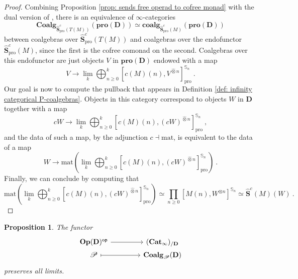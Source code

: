 \documentclass{proc-l}
\theoremstyle{plain}
\newtheorem{proposition}[{theorem}]{Proposition}
\theoremstyle{definition}
\theoremstyle{remark}
\begin{document}
\begin{proof}
Combining Proposition \ref{prop: sends free operad to cofree monad} with the dual version of \cite[Remark B.4]{pdalgebras}, there is an equivalence of $\infty$-categories
\[
\mathbf{Coalg}_{\widehat{\mathbf{S}}^c_{\mathrm{pro}}(T(M))}(\mathbf{pro}(\mathbf{D})) \simeq \mathbf{coalg}_{\widehat{\mathbf{S}}^c_{\mathrm{pro}}(M)}(\mathbf{pro}(\mathbf{D}))
\]
between coalgebras over $\widehat{\mathbf{S}}^c_{\mathrm{pro}}(T(M))$ and coalgebras over the endofunctor $\widehat{\mathbf{S}}^c_{\mathrm{pro}}(M)$, since the first is the cofree comonad on the second. Coalgebras over this endofunctor are just objects $V$ in $\mathbf{pro}(\mathbf{D})$ endowed with a map
\[
V \longrightarrow \lim_k \bigoplus_{n \geq 0}^{k} \left[c(M)(n),V^{\widehat{\otimes} n} \right]^{\mathbb{S}_n}_{\mathrm{pro}}~.
\]
Our goal is now to compute the pullback that appears in Definition \ref{def: infinity categorical P-coalgebras}. Objects in this category correspond to objects $W$ in $\mathbf{D}$ together with a map
\[
cW \longrightarrow \lim_k \bigoplus_{n \geq 0}^{k} \left[c(M)(n),(cW)^{\widehat{\otimes} n} \right]^{\mathbb{S}_n}_{\mathrm{pro}}~,
\]
and the data of such a map, by the adjunction $c \dashv \mathrm{mat}$, is equivalent to the data of a map
\[
W \longrightarrow \mathrm{mat}\left(\lim_k \bigoplus_{n \geq 0}^{k} \left[c(M)(n),(cW)^{\widehat{\otimes} n} \right]^{\mathbb{S}_n}_{\mathrm{pro}}\right)~.
\]
Finally, we can conclude by computing that
\[
\mathrm{mat}\left(\lim_k \bigoplus_{n \geq 0}^{k} \left[c(M)(n),(cW)^{\widehat{\otimes} n} \right]^{\mathbb{S}_n}_{\mathrm{pro}}\right) \simeq \prod_{n \geq 0} \left[M(n),W^{\otimes n} \right]^{\mathbb{S}_n} \simeq \widehat{\mathbf{S}}^c(M)(W)~.
\]
\end{proof}

\begin{proposition}%
\label{Proposition:3.16}\label{prop: taking infinity categories of coalgebras preserves limits}
The functor
\[
\begin{tikzcd}[column sep=3.5pc,row sep= 0pc]
\mathbf{Op}(\mathbf{D})^{\mathsf{op}} \arrow[r]
&(\mathbf{Cat}_\infty)_{/\mathbf{D}} \\
\mathscr{P} \arrow[r,mapsto]
&\mathbf{Coalg}_\mathscr{P}(\mathbf{D})
\end{tikzcd}
\]
preserves all limits.
\end{proposition}
\end{document}
